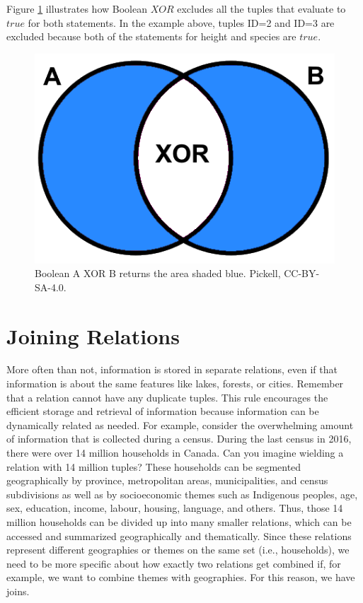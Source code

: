 \documentclass[
]{book}
\begin{document}
Figure \ref{fig:5-boolean-xor} illustrates how Boolean \(XOR\) excludes all the tuples that evaluate to \(true\) for both statements. In the example above, tuples ID=2 and ID=3 are excluded because both of the statements for height and species are \(true\).

\begin{figure}
\includegraphics[width=0.5\linewidth]{images/05-boolean-xor} \caption{Boolean A XOR B returns the area shaded blue. Pickell, CC-BY-SA-4.0.}\label{fig:5-boolean-xor}
\end{figure}

\section{Joining Relations}\label{joining-relations}

More often than not, information is stored in separate relations, even if that information is about the same features like lakes, forests, or cities. Remember that a relation cannot have any duplicate tuples. This rule encourages the efficient storage and retrieval of information because information can be dynamically related as needed. For example, consider the overwhelming amount of information that is collected during a census. During the last census in 2016, there were over 14 million households in Canada. Can you imagine wielding a relation with 14 million tuples? These households can be segmented geographically by province, metropolitan areas, municipalities, and census subdivisions as well as by socioeconomic themes such as Indigenous peoples, age, sex, education, income, labour, housing, language, and others. Thus, those 14 million households can be divided up into many smaller relations, which can be accessed and summarized geographically and thematically. Since these relations represent different geographies or themes on the same set (i.e., households), we need to be more specific about how exactly two relations get combined if, for example, we want to combine themes with geographies. For this reason, we have joins.
\end{document}
